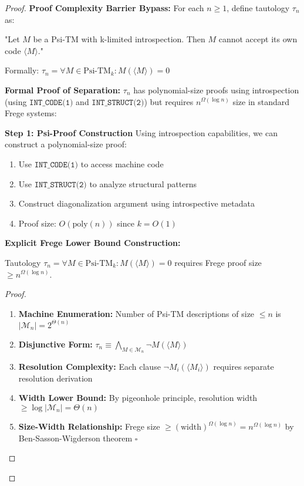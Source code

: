 \documentclass[11pt]{article}
\newcommand{\qed}{\hfill$\square$}
\begin{document}
\begin{proof}
\textbf{Proof Complexity Barrier Bypass:}
For each $n \geq 1$, define tautology $\tau_n$ as:

"Let $M$ be a Psi-TM with k-limited introspection. Then $M$ cannot accept its own code $\langle M \rangle$."

Formally: $\tau_n = \forall M \in \text{Psi-TM}_k: M(\langle M \rangle) = 0$

\textbf{Formal Proof of Separation:}
$\tau_n$ has polynomial-size proofs using introspection (using $\texttt{INT\_CODE(1)}$ and $\texttt{INT\_STRUCT(2)}$) but requires $n^{\Omega(\log n)}$ size in standard Frege systems:

\textbf{Step 1: Psi-Proof Construction}
Using introspection capabilities, we can construct a polynomial-size proof:
\begin{enumerate}
\item Use $\texttt{INT\_CODE(1)}$ to access machine code
\item Use $\texttt{INT\_STRUCT(2)}$ to analyze structural patterns
\item Construct diagonalization argument using introspective metadata
\item Proof size: $O(\text{poly}(n))$ since $k = O(1)$
\end{enumerate}

\textbf{Explicit Frege Lower Bound Construction:}
\begin{theorem}
Tautology $\tau_n = \forall M \in \text{Psi-TM}_k: M(\langle M \rangle) = 0$ requires Frege proof size $\geq n^{\Omega(\log n)}$.
\end{theorem}
\begin{proof}
\begin{enumerate}
\item \textbf{Machine Enumeration:} Number of Psi-TM descriptions of size $\leq n$ is $|\mathcal{M}_n| = 2^{\Theta(n)}$
\item \textbf{Disjunctive Form:} $\tau_n \equiv \bigwedge_{M \in \mathcal{M}_n} \neg M(\langle M \rangle)$
\item \textbf{Resolution Complexity:} Each clause $\neg M_i(\langle M_i \rangle)$ requires separate resolution derivation
\item \textbf{Width Lower Bound:} By pigeonhole principle, resolution width $\geq \log|\mathcal{M}_n| = \Theta(n)$
\item \textbf{Size-Width Relationship:} Frege size $\geq (\text{width})^{\Omega(\log n)} = n^{\Omega(\log n)}$ by Ben-Sasson-Wigderson theorem \qed
\end{enumerate}
\end{proof}


\end{proof}
\end{document}
